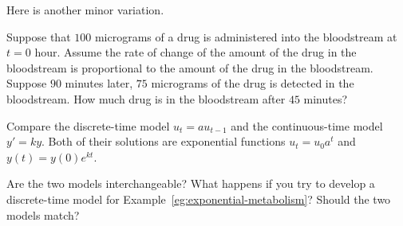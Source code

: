 \documentclass[../main.tex]{subfiles}
\begin{document}
Here is another minor variation.
\begin{exercise} \label{ex:exponential-metabolism-v3}
  Suppose that \(100\) micrograms of a drug is administered into the bloodstream at \(t = 0\) hour.  Assume the rate of change of the amount of the drug in the bloodstream is proportional to the amount of the drug in the bloodstream.  Suppose \(90\) minutes later, \(75\) micrograms of the drug is detected in the bloodstream. How much drug is in the bloodstream after \(45\) minutes?

  \blanks*
\end{exercise}
\clearpage

\begin{exercise} \label{ex:exponential-discrete-vs-continuous}
  Compare the discrete-time model \(u_{t} = a u_{t-1}\) and the continuous-time model \(y' = ky\). Both of their solutions are exponential functions \(u_{t} = u_{0} a^{t}\) and \(y(t) = y(0) e^{kt}\).

  Are the two models interchangeable?  What happens if you try to develop a discrete-time model for Example~\ref{eg:exponential-metabolism}?  Should the two models match?

\end{exercise}
\end{document}

